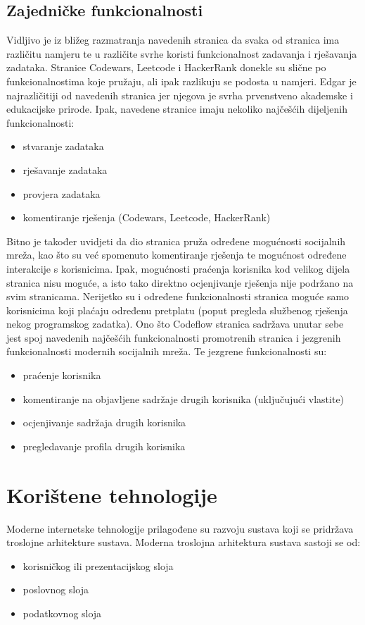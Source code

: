 \documentclass[times, utf8, zavrsni]{fer}
\begin{document}
	\section{Zajedničke funkcionalnosti}
	Vidljivo je iz bližeg razmatranja navedenih stranica da svaka od stranica ima različitu namjeru te u različite svrhe koristi funkcionalnost zadavanja i rješavanja zadataka. Stranice Codewars, Leetcode i HackerRank donekle su slične po funkcionalnostima koje pružaju, ali ipak razlikuju se podosta u namjeri. Edgar je najrazličitiji od navedenih stranica jer njegova je svrha prvenstveno akademske i edukacijske prirode. Ipak, navedene stranice imaju nekoliko najčešćih dijeljenih funkcionalnosti:
	\begin{itemize}
		\item stvaranje zadataka
		\item rješavanje zadataka
		\item provjera zadataka
		\item komentiranje rješenja (Codewars, Leetcode, HackerRank)
	\end{itemize}
	Bitno je također uvidjeti da dio stranica pruža određene mogućnosti socijalnih mreža, kao što su već spomenuto komentiranje rješenja te mogućnost određene interakcije s korisnicima. Ipak, mogućnosti praćenja korisnika kod velikog dijela stranica nisu moguće, a isto tako direktno ocjenjivanje rješenja nije podržano na svim stranicama. Nerijetko su i određene funkcionalnosti stranica moguće samo korisnicima koji plaćaju određenu pretplatu (poput pregleda službenog rješenja nekog programskog zadatka).
	Ono što Codeflow stranica sadržava unutar sebe jest spoj navedenih najčešćih funkcionalnosti promotrenih stranica i jezgrenih funkcionalnosti modernih socijalnih mreža. Te jezgrene funkcionalnosti su:
	\begin{itemize}
		\item praćenje korisnika
		\item komentiranje na objavljene sadržaje drugih korisnika (uključujući vlastite)
		\item ocjenjivanje sadržaja drugih korisnika
		\item pregledavanje profila drugih korisnika
	\end{itemize}


\chapter{Korištene tehnologije}
Moderne internetske tehnologije prilagođene su razvoju sustava koji se pridržava troslojne arhitekture sustava. Moderna troslojna arhitektura sustava sastoji se od:
\begin{itemize}
	\item korisničkog ili prezentacijskog sloja
	\item poslovnog sloja
	\item podatkovnog sloja
\end{itemize}
\end{document}
